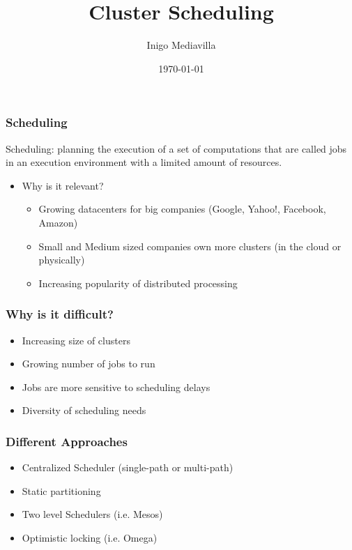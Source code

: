 \documentclass{beamer}
\title{Cluster Scheduling}
\author{Inigo Mediavilla}
\date\today
\begin{document}
  \begin{frame}
  \titlepage
  \end{frame}

  \begin{frame}
    \frametitle{Scheduling}
    \begin{definition}{Scheduling:}
    planning the execution of a set of computations that
    are called jobs in an execution environment with a limited amount
    of resources.
    \end{definition}
    \begin{itemize}
      \item Why is it relevant?
      \begin{itemize}
        \item Growing datacenters for big companies (Google, Yahoo!,
          Facebook, Amazon)
        \item Small and Medium sized companies own more clusters (in
          the cloud or physically)  
        \item Increasing popularity of distributed processing
      \end{itemize}
    \end{itemize}
  \end{frame}

  \begin{frame}
    \frametitle{Why is it difficult?}
    \begin{itemize}
      \item Increasing size of clusters
      \item Growing number of jobs to run
      \item Jobs are more sensitive to scheduling delays
      \item Diversity of scheduling needs
    \end{itemize}
  \end{frame}

  \begin{frame}
    \frametitle{Different Approaches}
    \begin{itemize}
      \item Centralized Scheduler (single-path or multi-path)
      \item Static partitioning
      \item Two level Schedulers (i.e. Mesos)
      \item Optimistic locking (i.e. Omega)
    \end{itemize}
  \end{frame}
\end{document}
